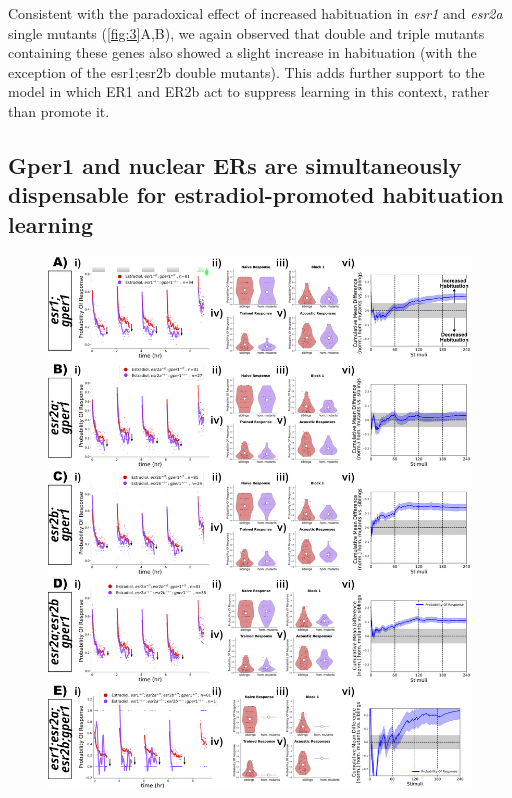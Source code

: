 \documentclass[10pt,lineno]{RandlettLab_elife}
\begin{document}
{Consistent with the paradoxical effect of increased habituation in \emph{esr1} and \emph{esr2a} single mutants (\autoref{fig:3}A,B), we again observed that double and triple mutants containing these genes also showed a slight increase in habituation (with the exception of the {esr1;esr2b} double mutants).
This adds further support to the model in which ER1 and ER2b act to suppress learning in this context, rather than promote it. 


\subsection{Gper1 and nuclear ERs are simultaneously dispensable for estradiol-promoted habituation learning}

\begin{figure}
\begin{fullwidth}
\begin{center}
\includegraphics[width=0.75\linewidth]{figures/gper1andNuclearMutants.png}


\end{center}
\end{fullwidth}
\end{figure}}
\end{document}
